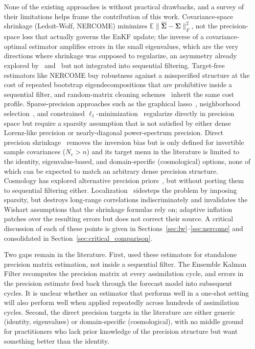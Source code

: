None of the existing approaches is without practical drawbacks, and a survey of their limitations helps frame the contribution of this work. Covariance-space shrinkage (Ledoit-Wolf, NERCOME) minimizes $\mathbb{E}\|\hat{\boldsymbol{\Sigma}} - \boldsymbol{\Sigma}\|_F^2$, not the precision-space loss that actually governs the EnKF update; the inverse of a covariance-optimal estimator amplifies errors in the small eigenvalues, which are the very directions where shrinkage was supposed to regularize, an asymmetry already explored by~\citet{schafer2005shrinkage} and~\citet{touloumis2015nonparametric} but not integrated into sequential filtering. Target-free estimators like NERCOME buy robustness against a misspecified structure at the cost of repeated bootstrap eigendecompositions that are prohibitive inside a sequential filter, and random-matrix cleaning schemes~\citep{bun2017cleaning} inherit the same cost profile. Sparse-precision approaches such as the graphical lasso~\citep{friedman2008sparse}, neighborhood selection~\citep{meinshausen2006high}, and constrained $\ell_1$-minimization~\citep{cai2011constrained} regularize directly in precision space but require a sparsity assumption that is not satisfied by either dense Lorenz-like precision or nearly-diagonal power-spectrum precision. Direct precision shrinkage~\citep{bodnar2016direct} removes the inversion bias but is only defined for invertible sample covariances ($N_e > n$) and its target menu in the literature is limited to the identity, eigenvalue-based, and domain-specific (cosmological) options, none of which can be expected to match an arbitrary dense precision structure. Cosmology has explored alternative precision priors~\citep{paz2015improving,taylor2014estimating,sellentin2016parameter,dodelson2013effect}, but without porting them to sequential filtering either. Localization~\citep{hamill2001distance,furrer2006covariance,menetrier2015linear} sidesteps the problem by imposing sparsity, but destroys long-range correlations indiscriminately and invalidates the Wishart assumptions that the shrinkage formulas rely on; adaptive inflation~\citep{anderson2009spatially,zhang2004impacts} patches over the resulting errors but does not correct their source. A critical discussion of each of these points is given in Sections~\ref{sec:lw}--\ref{sec:nercome} and consolidated in Section~\ref{sec:critical_comparison}.

Two gaps remain in the literature. First, \citep{looijmans2024comparison} used these estimators for standalone precision matrix estimation, not inside a sequential filter. The Ensemble Kalman Filter recomputes the precision matrix at every assimilation cycle, and errors in the precision estimate feed back through the forecast model into subsequent cycles. It is unclear whether an estimator that performs well in a one-shot setting will also perform well when applied repeatedly across hundreds of assimilation cycles. Second, the direct precision targets in the literature are either generic (identity, eigenvalues) or domain-specific (cosmological), with no middle ground for practitioners who lack prior knowledge of the precision structure but want something better than the identity.

